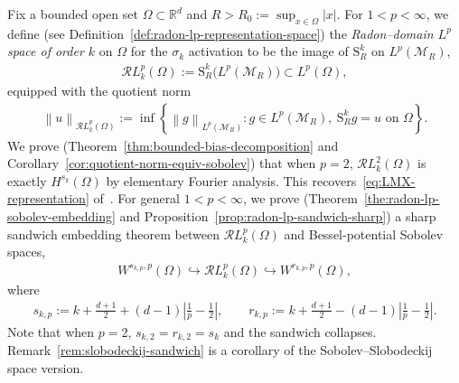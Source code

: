 \documentclass[12pt]{article}
\numberwithin{equation}{section}
\numberwithin{figure}{section}
\numberwithin{equation}{section}
\newcommand{\R}{\mathbb{R}}
\newcommand{\MR}{\mathcal M_R}
\newcommand{\norm}[1]{\left\|#1\right\|}
\begin{document}
Fix a bounded open set $\Omega\subset\R^d$ and
$R>R_0:=\sup_{x\in\Omega}|x|$.  For $1<p<\infty$, we define
(see Definition~\ref{def:radon-lp-representation-space})
the \emph{Radon--domain $L^p$ space of order $k$} on $\Omega$ for the $\sigma_k$
activation to be the image of $\mathrm{S}^k_R$ on $L^p(\MR)$,
\begin{align*}
    \mathcal{R}L^p_k(\Omega)
    :=\mathrm{S}^k_R\bigl(L^p(\MR)\bigr)\subset L^p(\Omega),
\end{align*}
equipped with the quotient norm
\begin{align*}
    \norm{u}_{\mathcal{R}L^p_k(\Omega)}
    :=\inf\left\{
    \norm{g}_{L^p(\MR)}:
    g\in L^p(\MR),\ \mathrm{S}^k_R g=u\text{ on }\Omega
    \right\}.
\end{align*}
We prove (Theorem~\ref{thm:bounded-bias-decomposition} and
Corollary~\ref{cor:quotient-norm-equiv-sobolev}) that when $p=2$, $\mathcal{R}L^2_k(\Omega)$ is exactly $H^{s_k}(\Omega)$
by elementary Fourier analysis. This recovers~\eqref{eq:LMX-representation}
of~\cite{liu_integralrepresentationssobolev_2025}. For general $1<p<\infty$, we
prove (Theorem~\ref{the:radon-lp-sobolev-embedding} and
Proposition~\ref{prop:radon-lp-sandwich-sharp}) a sharp sandwich embedding theorem
between $\mathcal{R}L^p_k(\Omega)$ and Bessel-potential Sobolev spaces,
\begin{align*}
    W^{s_{k,p},p}(\Omega)
    \hookrightarrow
    \mathcal{R}L^p_k(\Omega)
    \hookrightarrow W^{r_{k,p},p}(\Omega),
\end{align*}
where
\begin{align*}
    s_{k,p}:=k+\frac{d+1}{2}+(d-1)\left|\frac1p-\frac12\right|,
    \qquad
    r_{k,p}:=k+\frac{d+1}{2}-(d-1)\left|\frac1p-\frac12\right|.
\end{align*}
Note that when $p=2$, $s_{k,2}=r_{k,2}=s_k$ and the sandwich collapses. 
Remark~\ref{rem:slobodeckij-sandwich} is a corollary of the Sobolev--Slobodeckij space
version.
\end{document}
